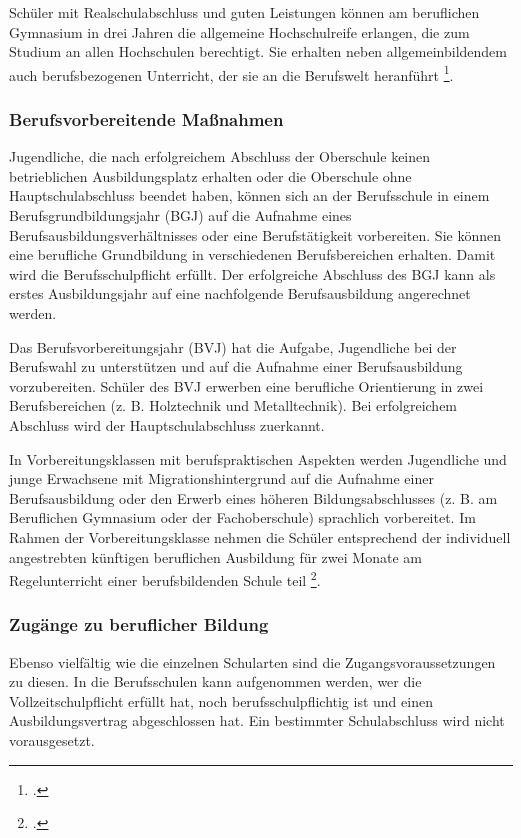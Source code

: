Schüler mit Realschulabschluss und guten Leistungen können am beruflichen Gymnasium in drei Jahren die allgemeine Hochschulreife erlangen, die zum Studium an allen Hochschulen berechtigt. Sie erhalten neben allgemeinbildendem auch berufsbezogenen Unterricht, der sie an die Berufswelt heranführt \footcites[vgl.]{SBSBSSSK2015}[vgl.][4ff]{SMKSK2013}.

\subsubsection{Berufsvorbereitende Maßnahmen}
\label{sec:BerufsvorbereitendeMassnahmen}

Jugendliche, die nach erfolgreichem Abschluss der Oberschule keinen betrieblichen Ausbildungsplatz erhalten oder die Oberschule ohne Hauptschulabschluss beendet haben, können sich an der Berufsschule in einem Berufsgrundbildungsjahr (BGJ) auf die Aufnahme eines Berufsausbildungsverhältnisses oder eine Berufstätigkeit vorbereiten. Sie können eine berufliche Grundbildung in verschiedenen Berufsbereichen erhalten. Damit wird die Berufsschulpflicht erfüllt. Der erfolgreiche Abschluss des BGJ kann als erstes Ausbildungsjahr auf eine nachfolgende Berufsausbildung angerechnet werden.

Das Berufsvorbereitungsjahr (BVJ) hat die Aufgabe, Jugendliche bei der Berufswahl zu unterstützen und auf die Aufnahme einer Berufsausbildung vorzubereiten. Schüler des BVJ erwerben eine berufliche Orientierung in zwei Berufsbereichen (z. B. Holztechnik und Metalltechnik). Bei erfolgreichem Abschluss wird der Hauptschulabschluss zuerkannt.

In Vorbereitungsklassen mit berufspraktischen Aspekten werden Jugendliche und junge Erwachsene mit Migrationshintergrund auf die Aufnahme einer Berufsausbildung oder den Erwerb eines höheren Bildungsabschlusses (z. B. am Beruflichen Gymnasium oder der Fachoberschule) sprachlich vorbereitet. Im Rahmen der Vorbereitungsklasse nehmen die Schüler entsprechend der individuell angestrebten künftigen beruflichen Ausbildung für zwei Monate am Regelunterricht einer berufsbildenden Schule teil \footcite[vgl.][15ff]{SMKSK2013}.

\subsubsection{Zugänge zu beruflicher Bildung}
\label{sec:ZugängeZuBeruflicherBildung}

Ebenso vielfältig wie die einzelnen Schularten sind die Zugangsvoraussetzungen zu diesen. In die Berufsschulen kann aufgenommen werden, wer die Vollzeitschulpflicht erfüllt hat, noch berufsschulpflichtig ist und einen Ausbildungsvertrag abgeschlossen hat. Ein bestimmter Schulabschluss wird nicht vorausgesetzt.

